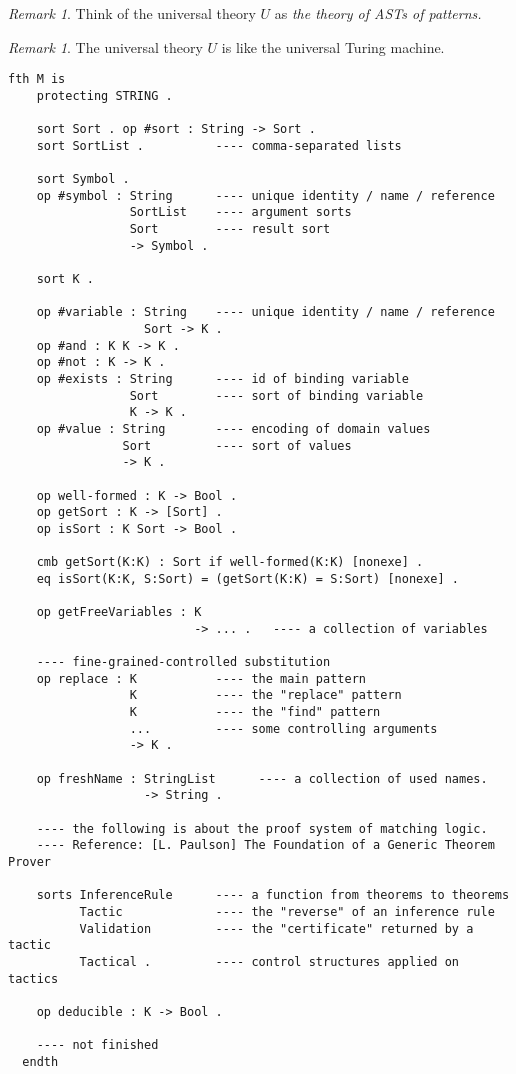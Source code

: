 \documentclass[UTF8]{article}
\newcounter{thmcounter}
\theoremstyle{plain}
\theoremstyle{definition}
\theoremstyle{remark}
\newtheorem{remark}[thmcounter]{Remark}
\begin{document}
{\begin{remark}
	Think of the universal theory $U$ as \emph{the theory of ASTs of patterns.}
\end{remark}
\begin{remark}
	The universal theory $U$ is like the universal Turing machine.
\end{remark}
}

\begin{Verbatim}[fontsize=\small]
  fth M is
    protecting STRING .
    
    sort Sort . op #sort : String -> Sort .
    sort SortList .          ---- comma-separated lists
    
    sort Symbol .
    op #symbol : String      ---- unique identity / name / reference
                 SortList    ---- argument sorts
                 Sort        ---- result sort
                 -> Symbol .
    
    sort K .
    
    op #variable : String    ---- unique identity / name / reference
                   Sort -> K .
    op #and : K K -> K .
    op #not : K -> K .
    op #exists : String      ---- id of binding variable
                 Sort        ---- sort of binding variable
                 K -> K .
    op #value : String       ---- encoding of domain values
                Sort         ---- sort of values
                -> K .
    
    op well-formed : K -> Bool .
    op getSort : K -> [Sort] .
    op isSort : K Sort -> Bool .
    
    cmb getSort(K:K) : Sort if well-formed(K:K) [nonexe] .
    eq isSort(K:K, S:Sort) = (getSort(K:K) = S:Sort) [nonexe] .
    
    op getFreeVariables : K 
                          -> ... .   ---- a collection of variables
    
    ---- fine-grained-controlled substitution
    op replace : K           ---- the main pattern 
                 K           ---- the "replace" pattern
                 K           ---- the "find" pattern
                 ...         ---- some controlling arguments
                 -> K .
    
    op freshName : StringList      ---- a collection of used names.
                   -> String .
    
    ---- the following is about the proof system of matching logic.
    ---- Reference: [L. Paulson] The Foundation of a Generic Theorem Prover
    
    sorts InferenceRule      ---- a function from theorems to theorems
          Tactic             ---- the "reverse" of an inference rule
          Validation         ---- the "certificate" returned by a tactic
          Tactical .         ---- control structures applied on tactics
    
    op deducible : K -> Bool .
    
    ---- not finished
  endth
\end{Verbatim}
\end{document}
